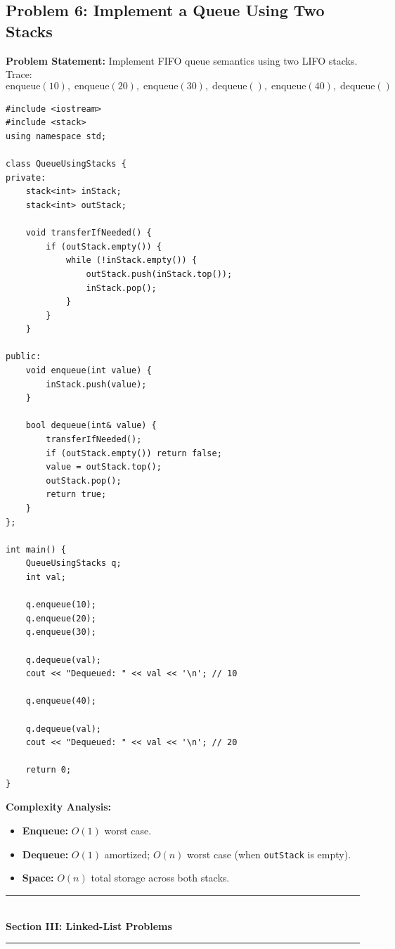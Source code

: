 \subsection{Problem 6: Implement a Queue Using Two Stacks}

\textbf{Problem Statement:} Implement FIFO queue semantics using two LIFO stacks. Trace:
\[
\text{enqueue}(10), \; \text{enqueue}(20), \; \text{enqueue}(30), \; \text{dequeue}(), \; \text{enqueue}(40), \; \text{dequeue}()
\]

\begin{lstlisting}[style=cppstyle, caption={C++ Implementation of Queue using Two Stacks.}]
#include <iostream>
#include <stack>
using namespace std;

class QueueUsingStacks {
private:
    stack<int> inStack;
    stack<int> outStack;

    void transferIfNeeded() {
        if (outStack.empty()) {
            while (!inStack.empty()) {
                outStack.push(inStack.top());
                inStack.pop();
            }
        }
    }

public:
    void enqueue(int value) {
        inStack.push(value);
    }

    bool dequeue(int& value) {
        transferIfNeeded();
        if (outStack.empty()) return false;
        value = outStack.top();
        outStack.pop();
        return true;
    }
};

int main() {
    QueueUsingStacks q;
    int val;

    q.enqueue(10);
    q.enqueue(20);
    q.enqueue(30);

    q.dequeue(val);
    cout << "Dequeued: " << val << '\n'; // 10

    q.enqueue(40);

    q.dequeue(val);
    cout << "Dequeued: " << val << '\n'; // 20

    return 0;
}
\end{lstlisting}

\textbf{Complexity Analysis:}
\begin{itemize}
    \item \textbf{Enqueue:} $O(1)$ worst case.
    \item \textbf{Dequeue:} $O(1)$ amortized; $O(n)$ worst case (when \texttt{outStack} is empty).
    \item \textbf{Space:} $O(n)$ total storage across both stacks.
\end{itemize}

\newpage
\begin{center}
\vspace{0.5em}
{\color{primary}\rule{0.45\textwidth}{1.2pt}}\\[4pt]
{\Large\bfseries\color{primary} Section III: Linked-List Problems}\\[2pt]
{\color{primary}\rule{0.45\textwidth}{1.2pt}}
\vspace{0.5em}
\end{center}

